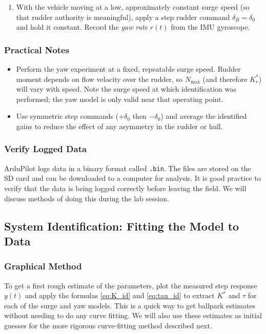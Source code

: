 \documentclass[../../book.tex]{subfiles}
\begin{document}
\begin{enumerate}
  \item With the vehicle moving at a low, approximately constant surge
        speed (so that rudder authority is meaningful), apply a step
        rudder command $\delta_R = \delta_0$ and hold it constant.
        Record the \emph{yaw rate} $r(t)$ from the IMU gyroscope.
\end{enumerate}

\subsubsection{Practical Notes}

\begin{itemize}
  \item Perform the yaw experiment at a fixed, repeatable surge speed.
        Rudder moment depends on flow velocity over the rudder, so
        $N_{\max}$ (and therefore $K_r^*$) will vary with speed.  Note
        the surge speed at which identification was performed; the yaw
        model is only valid near that operating point.
  \item Use symmetric step commands ($+\delta_0$ then $-\delta_0$) and
        average the identified gains to reduce the effect of any
        asymmetry in the rudder or hull.
\end{itemize}

\subsubsection{Verify Logged Data}

ArduPilot logs data in a binary format called \texttt{.bin}.  The files are stored on the SD card and can be downloaded to a computer for analysis.  It is good practice to verify that the data is being logged correctly before leaving the field.  We will discuss methods of doing this during the lab session.

\subsection{System Identification: Fitting the Model to Data}


\subsubsection{Graphical Method}

To get a first rough estimate of the parameters, plot the measured step response $y(t)$ and apply the formulas \eqref{eq:K_id} and \eqref{eq:tau_id} to extract $K^*$ and $\tau$ for each of the surge and yaw models. This is a quick way to get ballpark estimates without needing to do any curve fitting.  We will also use these estimates as initial guesses for the more rigorous curve-fitting method described next.
\end{document}
